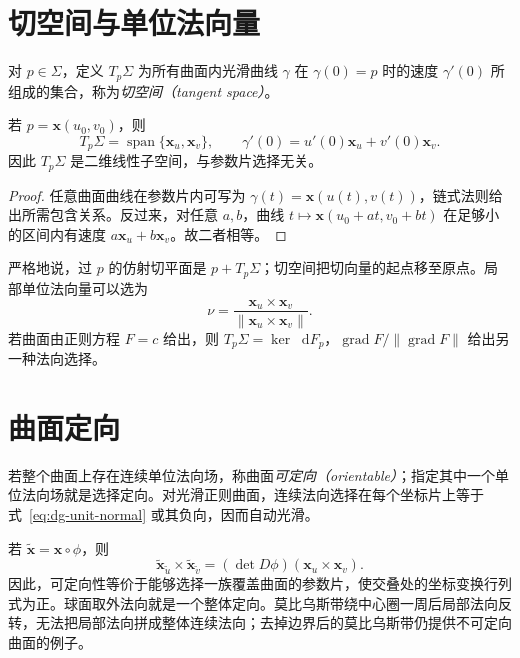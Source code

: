 \documentclass[UTF8,12pt,a4paper,fontset=fandol]{ctexbook}
\newcommand{\dd}{\mathop{}\!\mathrm d}
\newcommand{\norm}[1]{\lVert #1\rVert}
\DeclareMathOperator{\grad}{grad}
\begin{document}
\section{切空间与单位法向量}
\begin{definition}[切空间]
对 $p\in\Sigma$，定义 $T_p\Sigma$ 为所有曲面内光滑曲线 $\gamma$ 在 $\gamma(0)=p$ 时的速度 $\gamma'(0)$ 所组成的集合，称为\emph{切空间（tangent space）}。
\end{definition}
\begin{proposition}[切空间的坐标描述]
若 $p=\mathbf x(u_0,v_0)$，则
\begin{equation}
 T_p\Sigma=\operatorname{span}\{\mathbf x_u,\mathbf x_v\},
 \qquad
 \gamma'(0)=u'(0)\mathbf x_u+v'(0)\mathbf x_v.
 \label{eq:dg-tangent}
\end{equation}
因此 $T_p\Sigma$ 是二维线性子空间，与参数片选择无关。
\end{proposition}
\begin{proof}
任意曲面曲线在参数片内可写为 $\gamma(t)=\mathbf x(u(t),v(t))$，链式法则给出所需包含关系。反过来，对任意 $a,b$，曲线 $t\mapsto\mathbf x(u_0+at,v_0+bt)$ 在足够小的区间内有速度 $a\mathbf x_u+b\mathbf x_v$。故二者相等。
\end{proof}
严格地说，过 $p$ 的仿射切平面是 $p+T_p\Sigma$；切空间把切向量的起点移至原点。局部单位法向量可以选为
\begin{equation}
 \nu=\frac{\mathbf x_u\times\mathbf x_v}{\norm{\mathbf x_u\times\mathbf x_v}}.
 \label{eq:dg-unit-normal}
\end{equation}
若曲面由正则方程 $F=c$ 给出，则 $T_p\Sigma=\ker\dd F_p$，$\grad F/\norm{\grad F}$ 给出另一种法向选择。

\section{曲面定向}
\begin{definition}[可定向曲面]
若整个曲面上存在连续单位法向场，称曲面\emph{可定向（orientable）}；指定其中一个单位法向场就是选择定向。对光滑正则曲面，连续法向选择在每个坐标片上等于式~\eqref{eq:dg-unit-normal} 或其负向，因而自动光滑。
\end{definition}
若 $\widetilde{\mathbf x}=\mathbf x\circ\phi$，则
\[
 \widetilde{\mathbf x}_{\widetilde u}\times
 \widetilde{\mathbf x}_{\widetilde v}
 =(\det D\phi)(\mathbf x_u\times\mathbf x_v).
\]
因此，可定向性等价于能够选择一族覆盖曲面的参数片，使交叠处的坐标变换行列式为正。球面取外法向就是一个整体定向。莫比乌斯带绕中心圈一周后局部法向反转，无法把局部法向拼成整体连续法向；去掉边界后的莫比乌斯带仍提供不可定向曲面的例子。
\end{document}
